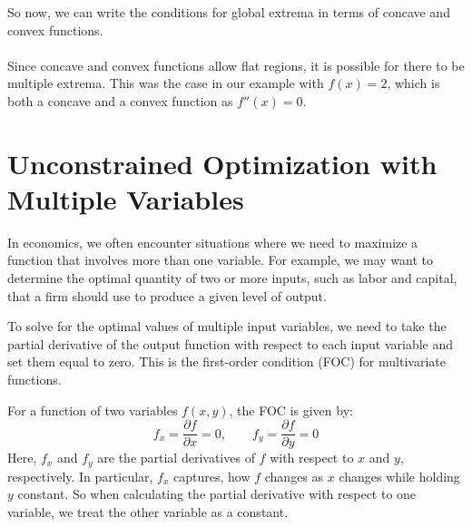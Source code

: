 \documentclass{./../../latex/handout}
\begin{document}
So now, we can write the conditions for global extrema in terms of concave and convex functions. \\

 \\

Since concave and convex functions allow flat regions, it is possible for there to be multiple extrema. This was the case in our example with $f(x)=2$, which is both a concave and a convex function as $f''(x)=0$. 


\section{Unconstrained Optimization with Multiple Variables}

In economics, we often encounter situations where we need to maximize a function that involves more than one variable. For example, we may want to determine the optimal quantity of two or more inputs, such as labor and capital, that a firm should use to produce a given level of output. 

To solve for the optimal values of multiple input variables, we need to take the partial derivative of the output function with respect to each input variable and set them equal to zero. This is the first-order condition (FOC) for multivariate functions. 

 For a function of two variables $f(x,y)$, the FOC is given by:
\[ f_x = \frac{\partial f}{\partial x} = 0 , \quad \quad f_y = \frac{\partial f}{\partial y} = 0 \]
Here, $f_x$ and $f_y$ are the partial derivatives of $f$ with respect to $x$ and $y$, respectively. In particular, $f_x$ captures, how $f$ changes as $x$ changes while holding $y$ constant. So when calculating the partial derivative with respect to one variable, we treat the other variable as a constant. \\
\end{document}
